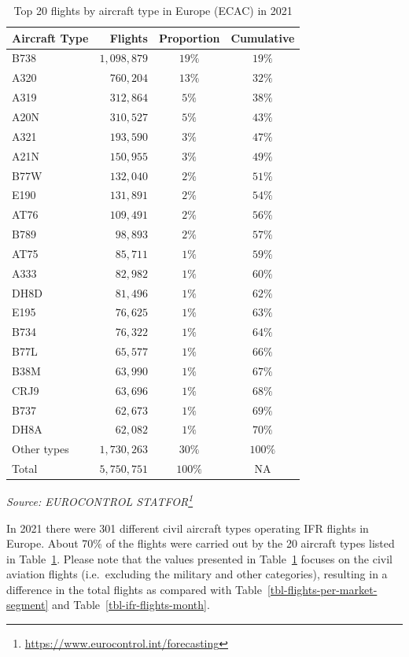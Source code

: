 \documentclass[
  11pt,
  a4paper,
]{book}
\DeclareRobustCommand{\href}[2]{#2\footnote{\url{#1}}}
\begin{document}
\hypertarget{tbl-flights-per-aircraft-type}{}
\setlength{\LTpost}{0mm}
\begin{longtable}{lrcc}
\caption{\label{tbl-flights-per-aircraft-type}Top 20 flights by aircraft type in Europe (ECAC) in 2021 }\tabularnewline

\toprule
Aircraft Type & Flights & Proportion & Cumulative \\ 
\midrule
B738 & $1,098,879$ & $19\%$ & $19\%$ \\ 
A320 & $760,204$ & $13\%$ & $32\%$ \\ 
A319 & $312,864$ & $5\%$ & $38\%$ \\ 
A20N & $310,527$ & $5\%$ & $43\%$ \\ 
A321 & $193,590$ & $3\%$ & $47\%$ \\ 
A21N & $150,955$ & $3\%$ & $49\%$ \\ 
B77W & $132,040$ & $2\%$ & $51\%$ \\ 
E190 & $131,891$ & $2\%$ & $54\%$ \\ 
AT76 & $109,491$ & $2\%$ & $56\%$ \\ 
B789 & $98,893$ & $2\%$ & $57\%$ \\ 
AT75 & $85,711$ & $1\%$ & $59\%$ \\ 
A333 & $82,982$ & $1\%$ & $60\%$ \\ 
DH8D & $81,496$ & $1\%$ & $62\%$ \\ 
E195 & $76,625$ & $1\%$ & $63\%$ \\ 
B734 & $76,322$ & $1\%$ & $64\%$ \\ 
B77L & $65,577$ & $1\%$ & $66\%$ \\ 
B38M & $63,990$ & $1\%$ & $67\%$ \\ 
CRJ9 & $63,696$ & $1\%$ & $68\%$ \\ 
B737 & $62,673$ & $1\%$ & $69\%$ \\ 
DH8A & $62,082$ & $1\%$ & $70\%$ \\ 
Other types & $1,730,263$ & $30\%$ & $100\%$ \\ 
Total & $5,750,751$ & $100\%$ & NA \\ 
\bottomrule
\end{longtable}
\begin{minipage}{\linewidth}
\emph{Source: \href{https://www.eurocontrol.int/forecasting}{EUROCONTROL STATFOR}}\\
\end{minipage}

In 2021 there were 301 different civil aircraft types operating IFR
flights in Europe. About 70\% of the flights were carried out by the 20
aircraft types listed in Table~\ref{tbl-flights-per-aircraft-type}.
Please note that the values presented in
Table~\ref{tbl-flights-per-aircraft-type} focuses on the civil aviation
flights (i.e.~excluding the military and other categories), resulting in
a difference in the total flights as compared with
Table~\ref{tbl-flights-per-market-segment} and
Table~\ref{tbl-ifr-flights-month}.
\end{document}
